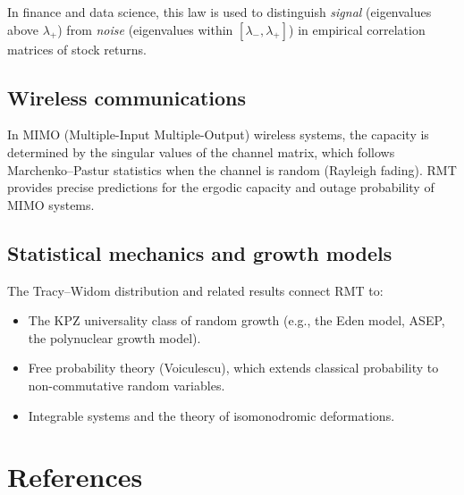 \documentclass[12pt,a4paper]{amsart}
\theoremstyle{definition}
\theoremstyle{remark}
\begin{document}
In finance and data science, this law is used to distinguish \emph{signal}
(eigenvalues above $\lambda_+$) from \emph{noise} (eigenvalues within
$[\lambda_-, \lambda_+]$) in empirical correlation matrices of stock returns.

\subsection{Wireless communications}

In MIMO (Multiple-Input Multiple-Output) wireless systems, the capacity is
determined by the singular values of the channel matrix, which follows
Marchenko--Pastur statistics when the channel is random (Rayleigh fading).
RMT provides precise predictions for the ergodic capacity and outage
probability of MIMO systems.

\subsection{Statistical mechanics and growth models}

The Tracy--Widom distribution and related results connect RMT to:
\begin{itemize}
  \item The KPZ universality class of random growth (e.g., the Eden model,
    ASEP, the polynuclear growth model).
  \item Free probability theory (Voiculescu), which extends classical
    probability to non-commutative random variables.
  \item Integrable systems and the theory of isomonodromic deformations.
\end{itemize}

\section{References}
\label{sec:references}
\end{document}
